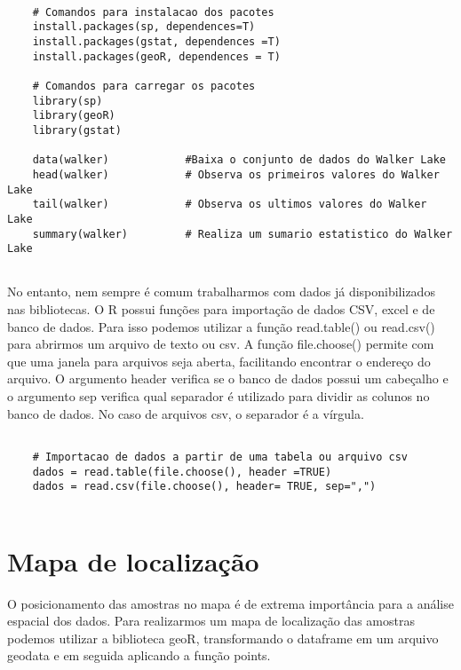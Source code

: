 \begin{scriptsize}
	\estiloR
	\begin{lstlisting}[caption={Criação de um vetor em R}, label=lst:rcode]
	
	# Comandos para instalacao dos pacotes
	install.packages(sp, dependences=T)
	install.packages(gstat, dependences =T)
	install.packages(geoR, dependences = T)
	
	# Comandos para carregar os pacotes 
	library(sp)
	library(geoR)
	library(gstat)
	
	data(walker)            #Baixa o conjunto de dados do Walker Lake
	head(walker)            # Observa os primeiros valores do Walker Lake
	tail(walker)            # Observa os ultimos valores do Walker Lake
	summary(walker)         # Realiza um sumario estatistico do Walker Lake
	
	\end{lstlisting}
\end{scriptsize}

No entanto, nem sempre é comum trabalharmos com dados já disponibilizados nas bibliotecas. O R possui funções para importação de dados CSV, excel e de banco de dados. Para isso podemos utilizar a função read.table() ou read.csv() para abrirmos um arquivo de texto ou csv. A função file.choose() permite com que uma janela para arquivos seja aberta, facilitando encontrar o endereço do arquivo. O argumento header verifica se o banco de dados possui um cabeçalho e o argumento sep verifica qual separador é utilizado para dividir as colunos no banco de dados. No caso de arquivos csv, o separador é a vírgula.


\begin{scriptsize}
	\estiloR
	\begin{lstlisting}[]
	
	# Importacao de dados a partir de uma tabela ou arquivo csv
	dados = read.table(file.choose(), header =TRUE)
	dados = read.csv(file.choose(), header= TRUE, sep=",")
	
	\end{lstlisting}
\end{scriptsize}

\section{Mapa de localização} 

O posicionamento das amostras no mapa é de extrema importância para a análise espacial dos dados. Para realizarmos um mapa de localização das amostras podemos utilizar a biblioteca geoR, transformando o dataframe em um arquivo geodata e em seguida aplicando a função points. 

